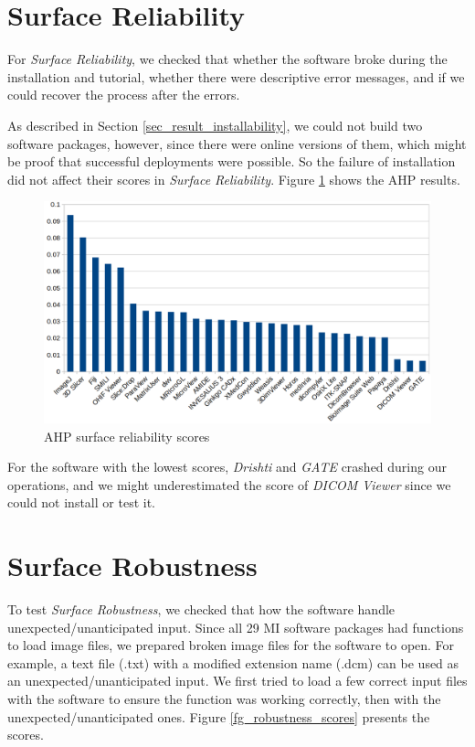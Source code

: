 \section{Surface Reliability}
For \textit{Surface Reliability}, we checked that whether the software broke during the installation and tutorial, whether there were descriptive error messages, and if we could recover the process after the errors.

As described in Section \ref{sec_result_installability}, we could not build two software packages, however, since there were online versions of them, which might be proof that successful deployments were possible. So the failure of installation did not affect their scores in \textit{Surface Reliability}. Figure \ref{fg_reliability_scores} shows the AHP results.

\begin{figure}[H]
\includegraphics[scale=0.38]{figures/reliability_scores.png}
\caption{AHP surface reliability scores}
\label{fg_reliability_scores}
\end{figure}

For the software with the lowest scores, \textit{Drishti} \cite{Limaye2012} and \textit{GATE} \cite{Jan2004} crashed during our operations, and we might underestimated the score of \textit{DICOM Viewer} since we could not install or test it.

\section{Surface Robustness}

To test \textit{Surface Robustness}, we checked that how the software handle unexpected/unanticipated input. Since all 29 MI software packages had functions to load image files, we prepared broken image files for the software to open. For example, a text file (.txt) with a modified extension name (.dcm) can be used as an unexpected/unanticipated input. We first tried to load a few correct input files with the software to ensure the function was working correctly, then with the unexpected/unanticipated ones. Figure \ref{fg_robustness_scores} presents the scores.

